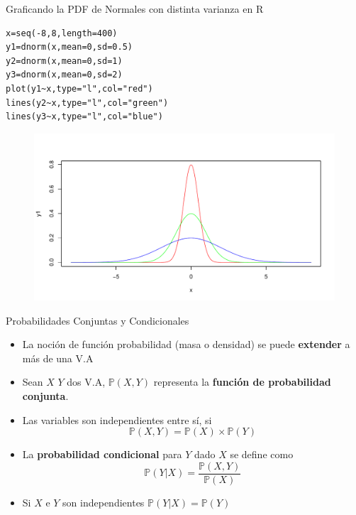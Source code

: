 \documentclass[handout]{beamer}
\begin{document}
\begin{frame}[fragile]{Graficando la PDF de Normales con distinta varianza en R}
\scriptsize{
\begin{verbatim}
x=seq(-8,8,length=400)
y1=dnorm(x,mean=0,sd=0.5)
y2=dnorm(x,mean=0,sd=1) 
y3=dnorm(x,mean=0,sd=2)
plot(y1~x,type="l",col="red")
lines(y2~x,type="l",col="green")
lines(y3~x,type="l",col="blue")
\end{verbatim}
}
 \begin{figure}[h!]
	\centering
	\includegraphics[scale=0.35]{pics/normplot.pdf}
\end{figure}



\end{frame}




\begin{frame}{Probabilidades Conjuntas y Condicionales}
\scriptsize{
\begin{itemize}
 \item La noción de función probabilidad (masa o densidad) se puede \textbf{extender} a más de una V.A 
 \item Sean $X$  $Y$ dos V.A, $\mathbb{P}(X,Y)$ representa la \textbf{función de probabilidad conjunta}.
 \item Las variables son independientes entre sí, si \begin{displaymath}
                                                      \mathbb{P}(X,Y)=\mathbb{P}(X)\times \mathbb{P}(Y)
                                                     \end{displaymath}
\item La \textbf{probabilidad condicional} para $Y$ dado $X$ se define como
 \begin{displaymath}
  \mathbb{P}(Y|X) = \frac{\mathbb{P}(X,Y)}{\mathbb{P}(X)}
 \end{displaymath}
\item Si $X$ e $Y$ son independientes $\mathbb{P}(Y|X)=\mathbb{P}(Y)$
\end{itemize}




} 
\end{frame}
\end{document}

